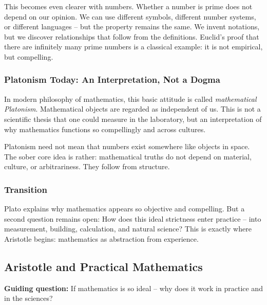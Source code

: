 This becomes even clearer with numbers.
Whether a number is prime
does not depend on our opinion.
We can use different symbols,
different number systems, or different languages --
but the property remains the same.
We invent notations,
but we discover relationships
that follow from the definitions.
Euclid's proof
that there are infinitely many prime numbers
is a classical example:
it is not empirical,
but compelling.

\subsubsection*{Platonism Today: An Interpretation, Not a Dogma}

In modern philosophy of mathematics, this basic attitude is called
\emph{mathematical Platonism}.
Mathematical objects are regarded as independent of us.
This is not a scientific thesis
that one could measure in the laboratory,
but an interpretation of
why mathematics functions so compellingly and across cultures.

Platonism need not mean
that numbers exist somewhere like objects in space.
The sober core idea is rather:
mathematical truths do not depend on material,
culture,
or arbitrariness.
They follow from structure.

\subsubsection*{Transition}

Plato explains
why mathematics appears so objective and compelling.
But a second question remains open:
How does this ideal strictness enter practice --
into measurement,
building,
calculation, and natural science?
This is exactly where Aristotle begins:
mathematics as abstraction from experience.


\subsection{Aristotle and Practical Mathematics}
\label{sec:8.2}

\textbf{Guiding question:} If mathematics is so ideal -- why does it work in practice and in the sciences?

